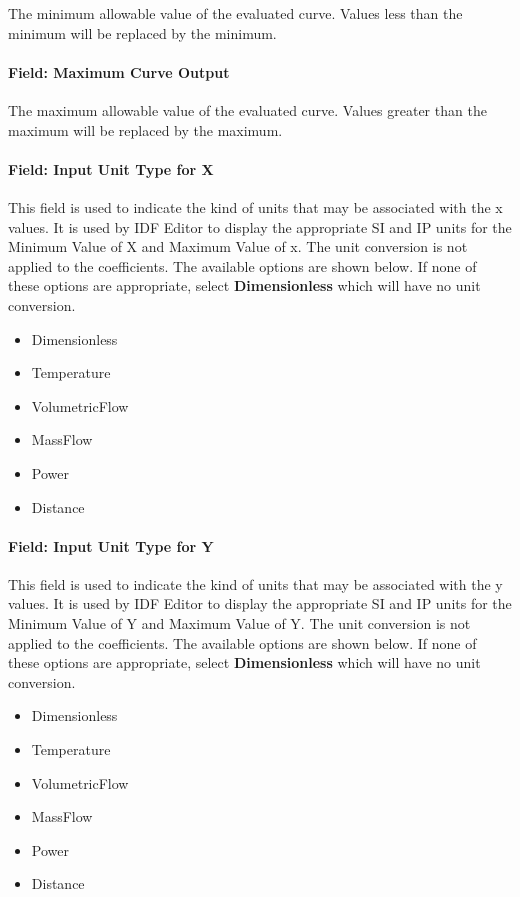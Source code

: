 The minimum allowable value of the evaluated curve. Values less than the minimum will be replaced by the minimum.

\paragraph{Field: Maximum Curve Output}\label{field-maximum-curve-output-9}

The maximum allowable value of the evaluated curve. Values greater than the maximum will be replaced by the maximum.

\paragraph{Field: Input Unit Type for X}\label{field-input-unit-type-for-x-11}

This field is used to indicate the kind of units that may be associated with the x values. It is used by IDF Editor to display the appropriate SI and IP units for the Minimum Value of X and Maximum Value of x. The unit conversion is not applied to the coefficients. The available options are shown below. If none of these options are appropriate, select \textbf{Dimensionless} which will have no unit conversion.

\begin{itemize}
\item
  Dimensionless
\item
  Temperature
\item
  VolumetricFlow
\item
  MassFlow
\item
  Power
\item
  Distance
\end{itemize}

\paragraph{Field: Input Unit Type for Y}\label{field-input-unit-type-for-y-6}

This field is used to indicate the kind of units that may be associated with the y values. It is used by IDF Editor to display the appropriate SI and IP units for the Minimum Value of Y and Maximum Value of Y. The unit conversion is not applied to the coefficients. The available options are shown below. If none of these options are appropriate, select \textbf{Dimensionless} which will have no unit conversion.

\begin{itemize}
\item
  Dimensionless
\item
  Temperature
\item
  VolumetricFlow
\item
  MassFlow
\item
  Power
\item
  Distance
\end{itemize}

